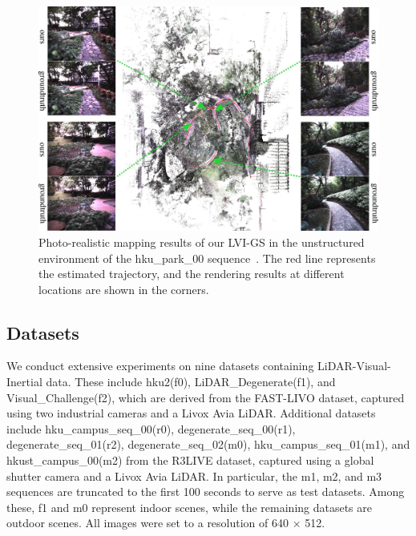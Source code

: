 \documentclass[lettersize,journal]{IEEEtran}
\begin{document}
\begin{figure}  %
    \captionsetup{justification=justified, labelsep=colon} %
    \centering
    \includegraphics[width=1.7\columnwidth]{image/fullseq/fullseq_forest.jpg} %
    \caption{
    Photo-realistic mapping results of our LVI-GS in the unstructured environment of the hku_park_00 sequence~\cite{r3live}.
    The red line represents the estimated trajectory, and the rendering results at different locations are shown in the corners.
    }
    \label{fig:fullseq_forest}
\end{figure}

\subsection{Datasets}
We conduct extensive experiments on nine datasets containing LiDAR-Visual-Inertial data. These include hku2(f0), LiDAR_Degenerate(f1), and Visual_Challenge(f2), which are derived from the FAST-LIVO\cite{fastlivo} dataset, captured using two industrial cameras and a Livox Avia LiDAR. Additional datasets include hku_campus_seq_00(r0), degenerate_seq_00(r1), degenerate_seq_01(r2), degenerate_seq_02(m0), hku_campus_seq_01(m1), and hkust_campus_00(m2) from the R3LIVE\cite{r3live} dataset, captured using a global shutter camera and a Livox Avia LiDAR. In particular, the m1, m2, and m3 sequences are truncated to the first 100 seconds to serve as test datasets. Among these, f1 and m0 represent indoor scenes, while the remaining datasets are outdoor scenes. 
All images were set to a resolution of 640 × 512.
\end{document}
